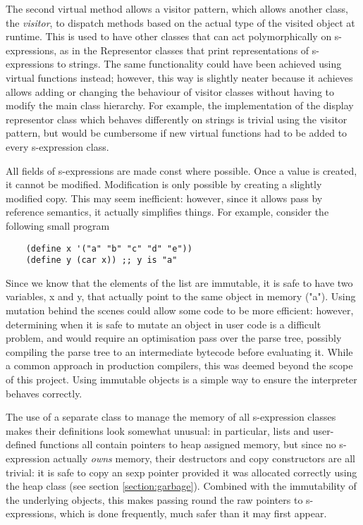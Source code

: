 \documentclass[12pt]{article}
\begin{document}
The second virtual method allows a visitor pattern, which allows
another class, the \textit{visitor}, to dispatch methods based on the
actual type of the visited object at runtime. This is used to have
other classes that can act polymorphically on s-expressions, as in the
Representor classes that print representations of s-expressions to
strings. The same functionality could have been achieved using virtual
functions instead; however, this way is slightly neater because it
achieves allows adding or changing the behaviour of visitor classes
without having to modify the main class hierarchy. For example, the
implementation of the display representor class which behaves
differently on strings is trivial using the visitor pattern, but would
be cumbersome if new virtual functions had to be added to every
s-expression class.



All fields of s-expressions are made const where possible. Once a
value is created, it cannot be modified. Modification is only possible
by creating a slightly modified copy. This may seem inefficient:
however, since it allows pass by reference semantics, it actually
simplifies things. For example, consider the following small program


\begin{lstlisting}
	(define x '("a" "b" "c" "d" "e"))
	(define y (car x)) ;; y is "a" 
\end{lstlisting}

Since we know that the elements of the list are immutable, it is safe
to have two variables, x and y, that actually point to the same object
in memory ("a"). Using mutation behind the scenes could allow some
code to be more efficient: however, determining when it is safe to
mutate an object in user code is a difficult problem, and would
require an optimisation pass over the parse tree, possibly compiling
the parse tree to an intermediate bytecode before evaluating it. While
a common approach in production compilers, this was deemed beyond the
scope of this project. Using immutable objects is a simple way to ensure
the interpreter behaves correctly.

The use of a separate class to manage the memory of all s-expression
classes makes their definitions look somewhat unusual: in particular,
lists and user-defined functions all contain pointers to heap assigned
memory, but since no s-expression actually \textit{owns} memory, their
destructors and copy constructors are all trivial: it is safe to copy
an sexp pointer provided it was allocated correctly using the heap
class (see section \ref{section:garbage}). Combined with the
immutability of the underlying objects, this makes passing round the
raw pointers to s-expressions, which is done frequently,
much safer than it may first appear.
\end{document}
